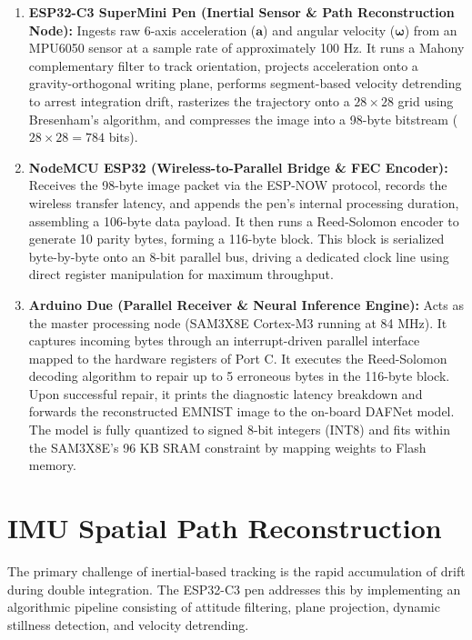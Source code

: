 \documentclass[12pt,a4paper]{article}
\begin{document}
\begin{enumerate}
    \item \textbf{ESP32-C3 SuperMini Pen (Inertial Sensor \& Path Reconstruction Node):} 
    Ingests raw 6-axis acceleration ($\mathbf{a}$) and angular velocity ($\boldsymbol{\omega}$) from an MPU6050 sensor at a sample rate of approximately 100 Hz. It runs a Mahony complementary filter to track orientation, projects acceleration onto a gravity-orthogonal writing plane, performs segment-based velocity detrending to arrest integration drift, rasterizes the trajectory onto a $28 \times 28$ grid using Bresenham's algorithm, and compresses the image into a 98-byte bitstream ($28 \times 28 = 784$ bits).
    
    \item \textbf{NodeMCU ESP32 (Wireless-to-Parallel Bridge \& FEC Encoder):} 
    Receives the 98-byte image packet via the ESP-NOW protocol, records the wireless transfer latency, and appends the pen's internal processing duration, assembling a 106-byte data payload. It then runs a Reed-Solomon encoder to generate 10 parity bytes, forming a 116-byte block. This block is serialized byte-by-byte onto an 8-bit parallel bus, driving a dedicated clock line using direct register manipulation for maximum throughput.
    
    \item \textbf{Arduino Due (Parallel Receiver & Neural Inference Engine):} 
    Acts as the master processing node (SAM3X8E Cortex-M3 running at 84 MHz). It captures incoming bytes through an interrupt-driven parallel interface mapped to the hardware registers of Port C. It executes the Reed-Solomon decoding algorithm to repair up to 5 erroneous bytes in the 116-byte block. Upon successful repair, it prints the diagnostic latency breakdown and forwards the reconstructed EMNIST image to the on-board DAFNet model. The model is fully quantized to signed 8-bit integers (INT8) and fits within the SAM3X8E's 96 KB SRAM constraint by mapping weights to Flash memory.
\end{enumerate}

\section{IMU Spatial Path Reconstruction}
The primary challenge of inertial-based tracking is the rapid accumulation of drift during double integration. The ESP32-C3 pen addresses this by implementing an algorithmic pipeline consisting of attitude filtering, plane projection, dynamic stillness detection, and velocity detrending.
\end{document}
